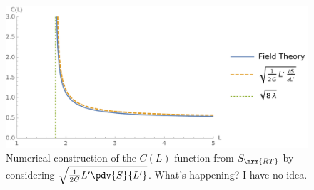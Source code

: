 \documentclass[a4paper
	,10pt
]{article}
\begin{document}
	\begin{figure}[!ht]
	\centering
	\includegraphics[width=.7\linewidth]{img/cFunctionGame.pdf}
	\caption[Numerical construction of the $C(L)$ function]{%
		Numerical construction of the $C(L)$ function from $S_\mrm{RT}$ by considering $
			\sqrt{
				\frac{1}{2G}
				L' \pdv{S}{L'}
			}
		$. What's happening? I have no idea.
	}
	\end{figure}
	
\vspace{1.2\baselineskip}
\pagebreak[4]
\raggedright
\printbibliography[%
	,heading = bibintoc
]
\end{document}
